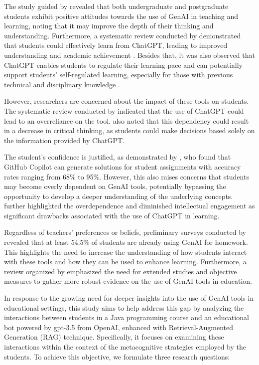 \documentclass[a4paper,twoside]{article}
\begin{document}
The study guided by \cite{chan23} revealed that both undergraduate and
postgraduate students exhibit positive attitudes towards the use of GenAI in
teaching and learning, noting that it may improve the depth of their thinking
and understanding. Furthermore, a systematic review conducted by \cite{Lo24}
demonstrated that students could effectively learn from ChatGPT, leading to
improved understanding and academic achievement \citep{Callejo24}. Besides that,
it was also observed that ChatGPT enables students to regulate their learning
pace \citep{Baha24} and can potentially support students’ self-regulated
learning, especially for those with previous technical and disciplinary
knowledge \citep{Xia23}.

However, researchers are concerned about the impact of these tools on
students. The systematic review conducted by \cite{Murillo23} indicated that
the use of ChatGPT could lead to an overreliance on the tool. \cite{chan23} also
noted that this dependency could result in a decrease in critical thinking, as
students could make decisions based solely on the information provided by
ChatGPT.

The student’s confidence is justified, as demonstrated by \cite{Puryear22}, who
found that GitHub Copilot can generate solutions for student assignments with
accuracy rates ranging from 68\% to 95\%. However, this also raises concerns
that students may become overly dependent on GenAI tools, potentially bypassing
the opportunity to develop a deeper understanding of the underlying concepts.
\cite{cai23} further highlighted the overdependence and diminished intellectual
engagement as significant drawbacks associated with the use of ChatGPT in
learning.

Regardless of teachers' preferences or beliefs, preliminary surveys conducted
by \cite{Dickey24} revealed that at least 54.5\% of students are already using
GenAI for homework. This highlights the need to increase the understanding of
how students interact with these tools and how they can be used to
enhance learning. Furthermore, a review organized by \cite{Lo24} emphasized the
need for extended studies and objective measures to gather more robust
evidence on the use of GenAI tools in education.

In response to the growing need for deeper insights into the use of GenAI tools
in educational settings, this study aims to help address this gap by analyzing
the interactions between students in a Java programming course and an
educational bot powered by gpt-3.5 from OpenAI, enhanced with
Retrieval-Augmented Generation (RAG) technique. Specifically, it focuses on
examining these interactions within the context of the metacognitive strategies
employed by the students. To achieve this objective, we formulate three research
questions:
\end{document}

